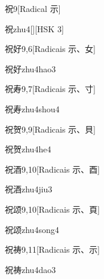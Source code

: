 \begin{entry}{祝}{9}[Radical ⽰]
  \begin{phonetics}{祝}{zhu4}[][HSK 3]
  \end{phonetics}
\end{entry}

\begin{entry}{祝好}{9,6}[Radicais ⽰、⼥]
  \begin{phonetics}{祝好}{zhu4hao3}
  \end{phonetics}
\end{entry}

\begin{entry}{祝寿}{9,7}[Radicais ⽰、⼨]
  \begin{phonetics}{祝寿}{zhu4shou4}
  \end{phonetics}
\end{entry}

\begin{entry}{祝贺}{9,9}[Radicais ⽰、⾙]
  \begin{phonetics}{祝贺}{zhu4he4}
  \end{phonetics}
\end{entry}

\begin{entry}{祝酒}{9,10}[Radicais ⽰、⾣]
  \begin{phonetics}{祝酒}{zhu4jiu3}
  \end{phonetics}
\end{entry}

\begin{entry}{祝颂}{9,10}[Radicais ⽰、⾴]
  \begin{phonetics}{祝颂}{zhu4song4}
  \end{phonetics}
\end{entry}

\begin{entry}{祝祷}{9,11}[Radicais ⽰、⽰]
  \begin{phonetics}{祝祷}{zhu4dao3}
  \end{phonetics}
\end{entry}

